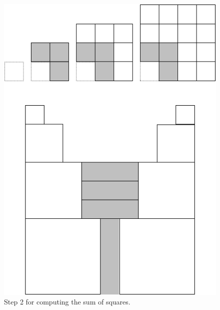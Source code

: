 \begin{figure}[ht]
\begin{center}
       \includegraphics[scale=0.4]{FiguresMaths/SumSquares3}
\caption{Step 2 for computing the sum of squares.}
       \label{fig:sumSquares3}
\end{center}
\end{figure}
